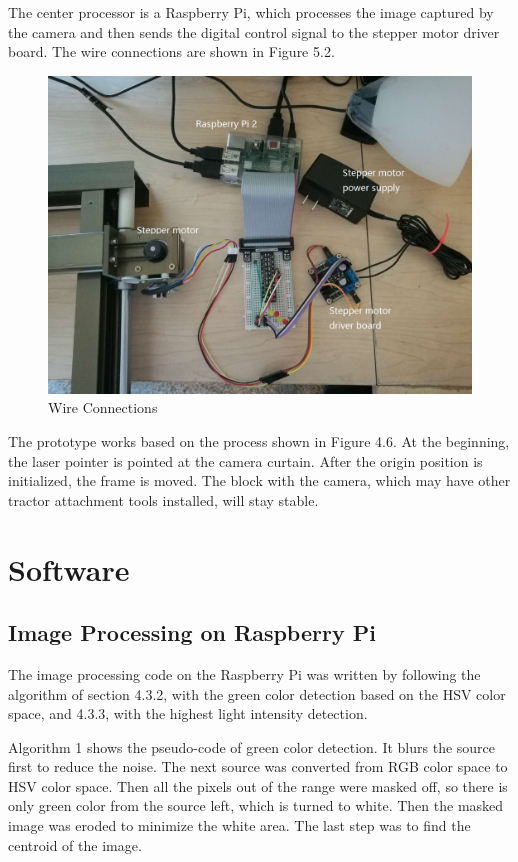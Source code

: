 The center processor is a Raspberry Pi, which processes the image captured by the camera and then sends the digital control signal to the stepper motor driver board. The wire connections are shown in Figure 5.2.
\begin{figure}[ht!]
\begin{center}
\includegraphics[scale = 0.4]{pics/connection.jpg}
\caption{Wire Connections}
\end{center}
\end{figure}
The prototype works based on the process shown in Figure 4.6. At the beginning, the laser pointer is pointed at the camera curtain. After the origin position is initialized, the frame is moved. The block with the camera, which may have other tractor attachment tools installed, will stay stable.

\section{Software}

\subsection{Image Processing on Raspberry Pi}
The image processing code on the Raspberry Pi was written by following the algorithm of section 4.3.2, with the green color detection based on the HSV color space, and 4.3.3, with the highest light intensity detection. 

Algorithm 1 shows the pseudo-code of green color detection. It blurs the source first to reduce the noise. The next source was converted from RGB color space to HSV color space. Then all the pixels out of the range were masked off, so there is only green color from the source left, which is turned to white. Then the masked image was eroded to minimize the white area. The last step was to find the centroid of the image.

